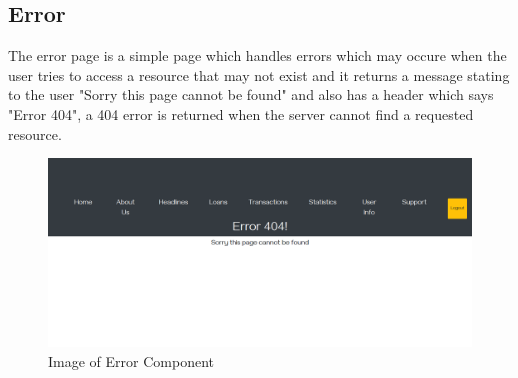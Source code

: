 \subsection{Error}
The error page is a simple page which handles errors which may occure when the user tries to
access a resource that may not exist and it returns a message stating to the user "Sorry this page cannot be found"
and also has a header which says "Error 404", a 404 error is returned when the server cannot find a requested resource.
\begin{figure}[H]
\includegraphics[width=\textwidth]{img/errorcomponent.png}
\caption{Image of Error Component}
\label{fig:Image of Error component}
\end{figure}
